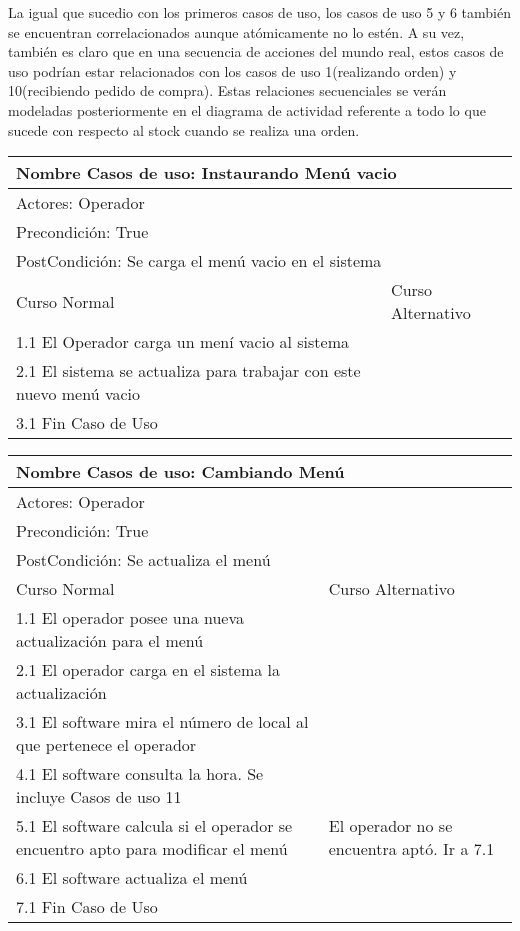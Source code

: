 \documentclass[a4paper,10pt]{article}
\begin{document}
\bigskip
La igual que sucedio con los primeros casos de uso, los casos de uso 5 y 6 tambi\'en se encuentran correlacionados aunque at\'omicamente no lo est\'en.
A su vez, tambi\'en es claro que en una secuencia de acciones del mundo real, estos casos de uso podr\'ian estar relacionados con los casos
de uso 1(realizando orden) y 10(recibiendo pedido de compra). Estas relaciones secuenciales se ver\'an modeladas posteriormente en el diagrama de actividad
referente a todo lo que sucede con respecto al stock cuando se realiza una orden.

\bigskip


\begin{center}
\begin{tabularx}{14cm}{|X|X|}
\hline
\multicolumn{2}{|l|}{Nombre Casos de uso: Instaurando Men\'u vacio}\\
\hline
\multicolumn{2}{|l|}{Actores: Operador}\\
\hline
\multicolumn{2}{|l|}{Precondici\'on: True}\\
\hline
\multicolumn{2}{|l|}{PostCondici\'on: Se carga el men\'u vacio en el sistema}\\
\hline
Curso Normal & Curso Alternativo\\
\hline
1.1 El Operador carga un men\'i vacio al sistema & 
\\
\hline
2.1 El sistema se actualiza para trabajar con este nuevo men\'u vacio & 
\\
\hline
3.1 Fin Caso de Uso &
\\
\hline
\end{tabularx}
\end{center}

\bigskip

\begin{center}
\begin{tabularx}{14cm}{|X|X|}
\hline
\multicolumn{2}{|l|}{Nombre Casos de uso: Cambiando Men\'u}\\
\hline
\multicolumn{2}{|l|}{Actores: Operador}\\
\hline
\multicolumn{2}{|l|}{Precondici\'on: True}\\
\hline
\multicolumn{2}{|l|}{PostCondici\'on: Se actualiza el men\'u}\\
\hline
Curso Normal & Curso Alternativo\\
\hline
1.1 El operador posee una nueva actualizaci\'on para el men\'u & 
\\
\hline
2.1 El operador carga en el sistema la actualizaci\'on & 
\\
\hline
3.1 El software mira el n\'umero de local al que pertenece el operador &
\\
\hline
4.1 El software consulta la hora. Se incluye Casos de uso 11 &
\\
\hline
5.1 El software calcula si el operador se encuentro apto para modificar el men\'u & El operador no se encuentra apt\'o. Ir a 7.1
\\
\hline
6.1 El software actualiza el men\'u &
\\
\hline
7.1 Fin Caso de Uso &
\\
\hline
\end{tabularx}
\end{center}
\end{document}
